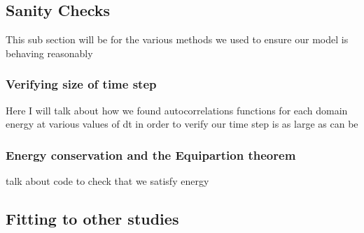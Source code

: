 	\subsection{Sanity Checks}
	This sub section will be for the various methods we used to ensure our model is behaving reasonably 
		\subsubsection{Verifying size of time step} 
		Here I will talk about how we found autocorrelations functions for each domain energy at various values of dt in order to verify our time step is as large as can be
		\subsubsection{Energy conservation and the Equipartion theorem} 
		talk about code to check that we satisfy energy 
	\subsection{Fitting to other studies} 
	